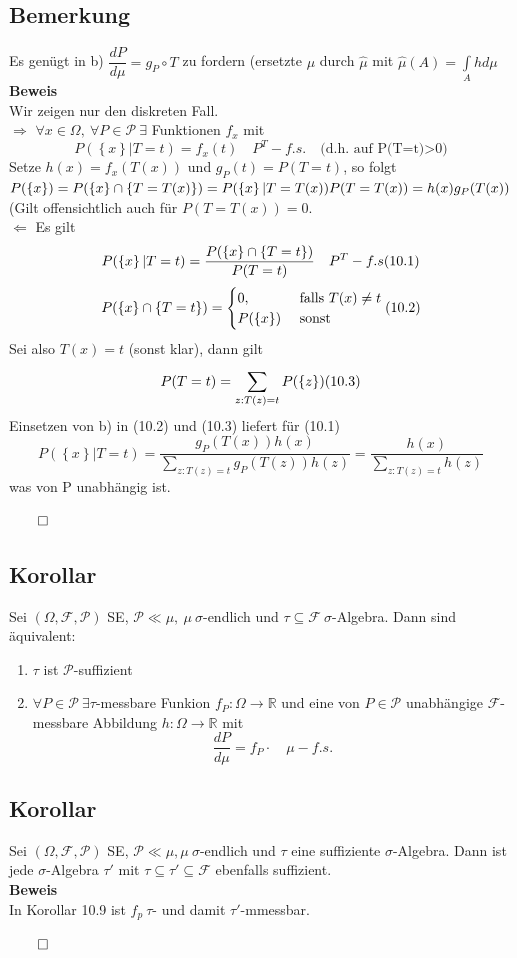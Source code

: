 \documentclass[german,10pt,oneside, fleqn, a4paper]{article}
\newcommand {\R}	{\mathbb{R}}
\newcommand{\Ra}	{\Rightarrow}
\newcommand{\La}	{\Leftarrow}
\newcommand{\ra}{\rightarrow}
\newcommand{\sm}[2][\infty]{\sum\limits_{#2}^{#1}}
\newcommand{\brac}[1]{\left\lbrace #1\right\rbrace}
\newcommand{\QED}{\begin{flushright}$\qed$\end{flushright}}
\newcommand{\mc}[1]{\mathcal{#1}}
\newcommand{\beweis}{\textbf{Beweis}\\}
\newcommand{\1}[1]{1_{#1}}
\newcommand{\2}[1]{\1{\brac{#1}}}
\newcommand{\f}{\mc{F}}
\newcommand{\p}{\mc{P}}
\begin{document}
\subsection{Bemerkung}
\label{10.8}
Es genügt in b) $\dfrac{dP}{d\mu}=g_P\circ T$ zu fordern (ersetzte $\mu$ durch $\widehat{\mu}$ mit $\widehat{\mu}(A)=\int\limits_Ahd\mu$\\
\beweis
Wir zeigen nur den diskreten Fall.\\
\glqq $\Ra$ \grqq $\forall x\in\Omega,\ \forall P\in\p\ \exists$ Funktionen $f_x$ mit \[
P(\brac{x}|T=t)=f_x(t)\quad P^T-f.s.\quad(\text{d.h. auf P(T=t)>0)}\]
Setze $h(x)=f_x(T(x))$ und $g_P(t)=P(T=t)$, so folgt \\
$P(\brac{x})=P(\brac{x}\cap\brac{T=T(x)})=P(\brac{x}|T=T(x))P(T=T(x))\\
=h(x)g_P(T(x))$\\
(Gilt offensichtlich auch für $P(T=T(x))=0$.\\
\glqq $\La$ \grqq Es gilt\\
\[P(\brac{x}|T=t)=\dfrac{P(\brac{x}\cap\brac{T=t})}{P(T=t)}\quad P^T-f.s \hfill(10.1)\]\[
P(\brac{x}\cap\brac{T=t})=\begin{cases}
0, & \text{ falls }T(x)\neq t\\
P(\brac{x}) & \text{ sonst}
\end{cases}\hfill (10.2)\]
Sei also $T(x)=t$ (sonst klar), dann gilt\[
P(T=t)=\sm[]{z:T(z)=t}P(\brac{z})\hfill(10.3)\]
Einsetzen von b) in (10.2) und (10.3) liefert für (10.1)\[
P(\brac{x}|T=t)=\dfrac{g_P(T(x))h(x)}{\sm[]{z:T(z)=t}g_P(T(z))h(z)}=\dfrac{h(x)}{\sm[]{z:T(z)=t}h(z)}\]
was von P unabhängig ist.\QED

\subsection{Korollar}
\label{10.9}
Sei $(\Omega,\f,\p)$ SE, $\p\ll\mu,\ \mu\ \sigma$-endlich und $\tau\subseteq\f\ \sigma$-Algebra. Dann sind äquivalent:\begin{enumerate}[label=(\alph*)]
\item $\tau$ ist $\p$-suffizient
\item $\forall P\in\p\ \exists \tau$-messbare Funkion $f_P:\Omega\ra\R$ und eine von $P\in\p$ unabhängige $\f$-messbare Abbildung $h:\Omega\ra\R$ mit \[\dfrac{dP}{d\mu}=f_P\cdot\quad \mu-f.s.\]
\end{enumerate}

\subsection{Korollar}
\label{10.10}
Sei $(\Omega,\f,\p)$ SE, $\p\ll\mu, \mu\ \sigma$-endlich und $\tau$ eine suffiziente $\sigma$-Algebra. Dann ist jede $\sigma$-Algebra $\tau'$ mit $\tau\subseteq\tau'\subseteq\f$ ebenfalls suffizient.\\
\beweis
In Korollar 10.9 ist $f_p\ \tau$- und damit $\tau'$-mmessbar.\QED
\end{document}
